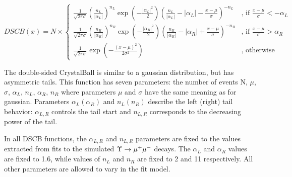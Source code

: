 \begin{equation}
DSCB(x) = N \times
\begin{cases}
\frac{1}{\sqrt{2\pi\sigma}}{(\frac{n_L}{|\alpha_L|})}^{n_L}\exp(-\frac{|\alpha_L|^2}{2}){(\frac{n_L}{|\alpha_L|}-|\alpha_L|-\frac{x-\mu}{\sigma})}^{-n_L} & \text{, if $\frac{x-\mu}{\sigma} < -\alpha_L$}\\
\frac{1}{\sqrt{2\pi\sigma}}{(\frac{n_R}{|\alpha_R|})}^{n_R}\exp(-\frac{|\alpha_R|^2}{2}){(\frac{n_R}{|\alpha_R|}-|\alpha_R|+\frac{x-\mu}{\sigma})}^{-n_R} & \text{, if $\frac{x-\mu}{\sigma} > \alpha_R$}\\
\frac{1}{\sqrt{2\pi\sigma}}\exp(-\frac{{(x-\mu)}^2}{2\sigma^2}) & \text{, otherwise}
\end{cases}
\label{eq:dcb}
\end{equation}

The double-sided CrystalBall is similar to a gaussian
distribution, but has asymmetric tails. This function has seven parameters:
the number of events N, $\mu$, $\sigma$, $\alpha_L$, $n_L$, $\alpha_R$, $n_R$ where parameters $\mu$
and $\sigma$ have the same meaning as for gaussian. Parameters $\alpha_L
(\alpha_R)$ and $n_L (n_R)$ describe the left (right) tail behavior:
$\alpha_{L,R}$ controls the tail start and $n_{L,R}$ corresponds to the
decreasing power of the tail. 




In all DSCB functions, the  $\alpha_{L,R}$ and $n_{L,R}$ parameters are fixed to the values extracted
from fits to the simulated $\Upsilon \rightarrow {\ensuremath{\mu^+\mu^-}}$ decays. The $\alpha_L$ and
$\alpha_R$ values are fixed to 1.6, while values of $n_L$  and $n_R$ are fixed
to 2 and 11 respectively. All other parameters are allowed to vary in the fit model.

